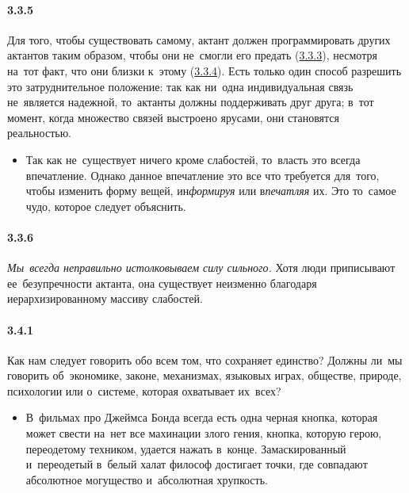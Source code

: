 \paragraph{3.3.5}\hypertarget{par:3.3.5}{} Для того, чтобы существовать самому, актант должен программировать других актантов таким образом, чтобы они не~смогли его предать (\hyperlink{par:3.3.3}{3.3.3}), несмотря на~тот факт, что они близки к~этому (\hyperlink{par:3.3.4}{3.3.4}). Есть только один способ разрешить это затруднительное положение: так как ни~одна индивидуальная связь не~является надежной, то~актанты должны поддерживать друг друга; в~тот момент, когда множество связей выстроено ярусами, они становятся реальностью.
	\begin{itemize}
	\item 
	Так как не~существует ничего кроме слабостей, то~власть это всегда впечатление. Однако данное впечатление это все что требуется для~того, чтобы изменить форму вещей, ин{\itshape{формируя}} или в{\itshape{печатляя}} их. Это то~самое чудо, которое следует объяснить.
	\end{itemize}

\paragraph{3.3.6}\hypertarget{par:3.3.6}{} {\itshape Мы~всегда неправильно истолковываем силу сильного.} Хотя люди приписывают ее~безупречности актанта, она существует неизменно благодаря иерархизированному массиву слабостей.


\paragraph{3.4.1}\hypertarget{par:3.4.1}{} Как нам следует говорить обо всем том, что сохраняет единство? Должны ли~мы говорить об~экономике, законе, механизмах, языковых играх, обществе, природе, психологии или о~системе, которая охватывает их~всех?
	\begin{itemize}
	\item 
 В~фильмах про Джеймса Бонда всегда есть одна черная кнопка, которая может свести на~нет все махинации злого гения, кнопка, которую герою, переодетому техником, удается нажать в~конце. Замаскированный и~переодетый в~белый халат философ достигает точки, где совпадают абсолютное могущество и~абсолютная хрупкость.
	\end{itemize}

